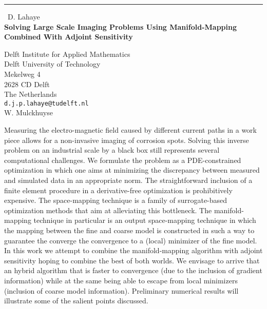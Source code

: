 \documentclass{report}
\begin{document}
\begin{center}
\rule{6in}{1pt} \
{\large D. Lahaye \\
{\bf Solving Large Scale Imaging Problems Using Manifold-Mapping Combined With Adjoint Sensitivity }}

Delft Institute for Applied Mathematics \\ Delft University of Technology \\ Mekelweg 4 \\ 2628 CD Delft \\ The Netherlands
\\
{\tt d.j.p.lahaye@tudelft.nl}\\
W.  Mulckhuyse\end{center}

Measuring the electro-magnetic field caused by different
current paths in a work piece allows for a non-invasive
imaging of corrosion spots. Solving this inverse problem
on an industrial scale by a black box still represents
several computational challenges. We formulate the problem
as a PDE-constrained optimization in which one aims at
minimizing the discrepancy between measured and simulated
data in an appropriate norm. The straightforward inclusion
of a finite element procedure in a derivative-free optimization
is prohibitively expensive. The space-mapping technique is a family of
surrogate-based optimization methods that aim at alleviating this
bottleneck. The manifold-mapping technique in particular is an output
space-mapping technique in which the mapping between the fine and coarse
model is constructed in
such a way to guarantee the converge the convergence to a
(local) minimizer of the fine model. In this work we attempt to combine
the manifold-mapping algorithm with adjoint sensitivity hoping to combine
the best of both worlds. We envisage to arrive that an hybrid algorithm
that is faster to convergence (due to
the inclusion of gradient information) while at the same being able to
escape from local minimizers (inclusion of coarse model information).
Preliminary numerical results will illustrate some of the salient points
discussed.
\end{document}

